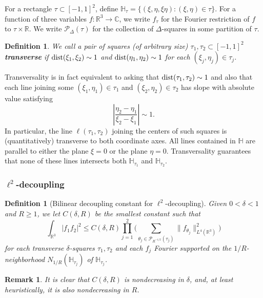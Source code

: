 \documentclass{amsart}%
\numberwithin{equation}{section}
\newtheorem{remark}[theorem]{Remark}
\newtheorem{definition}[theorem]{Definition}
\newcommand{\C}{\mathbb{C}}
\newcommand{\cP}{\mathcal P}
\newcommand{\ZH}{\mathbb{H}}
\newcommand{\R}{\mathbb{R}}
\newcommand{\1}{\mathbbm{1}}
\newcommand{\dist}{{\rm dist}}
\begin{document}
For a rectangle $\tau\subset [-1,1]^2$, define $\ZH_\tau=\{(\xi,\eta,\xi\eta):(\xi,\eta)\in\tau\}$.
For a function of three variables $f:\R^3\to\C$, we write $f_\tau$  for the Fourier restriction of $f$ to $\tau\times \R$.
We write $\cP_\Delta(\tau)$ for the collection of $\Delta$-squares in some partition of $\tau$. 
\begin{definition}
\label{transversality}
	We call a pair of squares (of arbitrary size) $\tau_1,\tau_2\subset [-1,1]^2$ {\bf transverse} if $\dist(\xi_1,\xi_2)\sim 1$ and $\dist(\eta_1,\eta_2)\sim 1$ for each $(\xi_j,\eta_j)\in \tau_j$.
\end{definition}    
Transversality is in fact equivalent to asking that $\dist(\tau_1,\tau_2)\sim 1$ and also that each line joining some $(\xi_1,\eta_1)\in\tau_1$ and $(\xi_2,\eta_2)\in\tau_2$ has slope with absolute value satisfying $$\left|\frac{\eta_2-\eta_1}{\xi_2-\xi_1}\right|\sim 1.$$
In particular,  the line 
    $\ell(\tau_1,\tau_2)$ joining the centers of such squares
is (quantitatively) transverse to both coordinate axes.	All lines contained in $\ZH$ are parallel to either the plane $\xi=0$ or the plane $\eta=0$. Transversality guarantees that none of these lines intersects both $\ZH_{\tau_1}$ and $\ZH_{\tau_2}$.

\medskip

\subsubsection{$\ell^2$-decoupling}




\begin{definition}[Bilinear decoupling constant for $\ell^2$-decoupling]
Given $0<\delta<1$ and $R\ge 1$, we let $C(\delta,R)$ be the smallest constant such that 
\begin{equation}
\label{l2-decoupling}
    \int_{\R^3}|f_1f_2|^2\le C(\delta,R) \prod_{j=1}^2\Big(\sum_{\theta_j\in \cP_{R^{-1/2}}(\tau_j)}\big\|f_{\theta_j}\big\|_{L^4(\R^3)}^2\Big)
\end{equation}
for each transverse $\delta$-squares $\tau_1,\tau_2$ and  each  $f_j$ Fourier supported on the $1/R$-neighborhood $N_{1/R}(\ZH_{\tau_j})$ of $\ZH_{\tau_j}$.    
\end{definition}

\begin{remark}
\rm

It is clear that $C(\delta,R)$ is nondecreasing in $\delta$, and, at least heuristically, it is also nondecreasing in $R$.

\end{remark}
\end{document}
